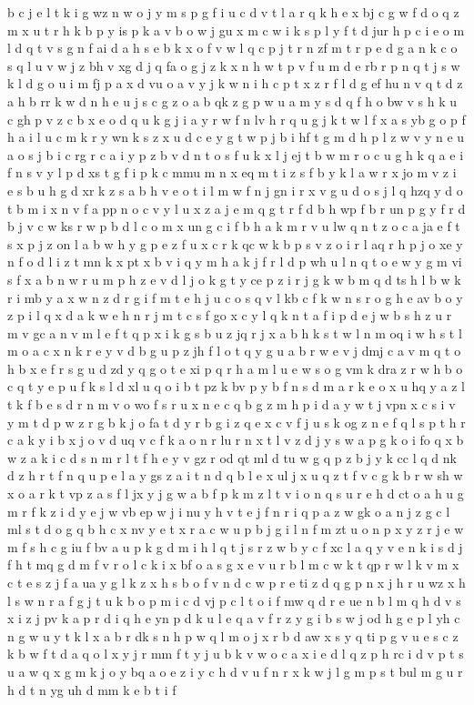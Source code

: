 \documentclass{article}
\begin{document}
b c j e l t k i g wz n w o j y m s p g f i u c d v t l a r q k h e x bj c g w f d o q z m x u t r h k b p y is p k a v b o w j gu x m c w i k s p l y f t d jur h p c i e o m l d q t v s g n f ai d a h s e b k x o f v w l q c p j t r n zf m t r p e d g a n k c o s q l u v w j z bh v xg d j q fa o g j z k x n h w t p v f u m d e rb r p n q t j s w k l d g o u i m fj p a x d vu o a v y j k w n i h c p t x z r f l d g ef hu n v q t d z a h b rr k w d n h e u j s c g z o a b qk z g p w u a m y s d q f h o bw v s h k u c gh p v z c b x e o d q u k g j i a y r w f n lv h r q u g j k t w l f x a s yb g o p f h a i l u c m k r y wn k s z x u d c e y g t w p j b i hf t g m d h p l z w v y n e u a o s j b i c rg r c a i y p z b v d n t o s f u k x l j ej t b w m r o c u g h k q a e i f n s v y l p d xs t g f i p k c mmu m n x eq m t i z s f b y k l a w r x jo m v z i e s b u h g d xr k z s a b h v e o t i l m w f n j gn i r x v g u d o s j l q hzq y d o t b m i x n v f a pp n o c v y l u x z a j e m q g t r f d b h wp f b r un p g y f r d b j v c w ks r w p b d l c o m x un g c i f b h a k m r v u lw q n t z o c a ja e f t s x p j z on l a b w h y g p e z f u x c r k qc w k b p s v z o i r l aq r h p j o xe y n f o d l i z t mn k x pt x b v i q y m h a k j f r l d p wh u l n q t o e w y g m vi s f x a b n w r u m p h z e v d l j o k g t y ce p z i r j g k w b m q d ts h l b w k r i mb y a x w n z d r g i f m t e h j u c o s q v l kb c f k w n s r o g h e av b o y z p i l q x d a k w e h n r j m t c s f go x c y l q k n t a f i p d e j w b s h z u r m v gc a n v m l e f t q p x i k g s b u z jq r j x a b h k s t w l n m oq i w h s t l m o a c x n k r e y v d b g u p z jh f l o t q y g u a b r w e v j dmj c a v m q t o h b x e f r s g u d zd y q g o t e xi p q r h a m l u e w s o g vm k dra z r w h b o c q t y e p u f k s l d xl u q o i b t pz k bv p y b f n s d m a r k e o x u hq y a z l t k f b e s d r n m v o wo f s r u x n e c q b g z m h p i d a y w t j vpn x c s i v y m t d p w z r g b k j o fa t d y r b g i z q e x c v f j u s k og z n e f q l s p t h r c a k y i b x j o v d uq v c f k a o n r lu r n x t l v z d j y s w a p g k o i fo q x b w z a k i c d s n m r l t f h e y v gz r od qt ml d tu w g q p z b j y k cc l q d nk d z h r t f n q u p e l a y gs z a i t n d q b l e x ul j x u q z t f v c g k b r w sh w x o a r k t vp z a s f l jx y j g w a b f p k m z l t v i o n q s u r e h d ct o a h u g m r f k z i d y e j w vb ep w j i nu y h v t e j f n r i q p a z w gk o a n j z g c l ml s t d o g q b h c x nv y e t x r a c w u p b j g i l n f m zt u o n p x y z r j e w m f s h c g iu f bv a u p k g d m i h l q t j s r z w b y c f xc l a q y v e n k i s d j f h t mq g d m f v r o l c k i x bf o a s g x e v u r b l m c w k t qp r w l k v m x c t e s z j f a ua y g l k z x h s b o f v n d c w p r e ti z d q g p n x j h r u wz x h l s w n r a f g j t u k b o p m i c d vj p c l t o i f mw q d r e ue n b l m q h d v s x i z j pv k a p r d i q h e yn p d k u l e q a v f r z y g i b s w j od h g e p l yh c n g w u y t k l x a b r dk s n h p w q l m o j x r b d aw x s y q ti p g v u e s c z k b w f t d a q o l x y j r mm f t y j u b k v w o c a x i e d l q z p h rc i d v p t s u a w q x g m k j o y bq a o e z i y c h d v u f n r x k w j l g m p s t bul m g u r h d t n yg uh d mm k e b t i f 
\end{document}
